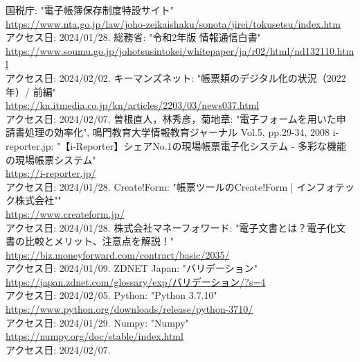 \documentclass[uplatex, report, a4j, 10pt]{jsbook}
\begin{document}
\begin{thebibliography}{0}
  国税庁: "電子帳簿保存制度特設サイト"\\\url{https://www.nta.go.jp/law/joho-zeikaishaku/sonota/jirei/tokusetsu/index.htm}\\アクセス日: 2024/01/28.
  総務省: "令和2年版 情報通信白書"\\\url{https://www.soumu.go.jp/johotsusintokei/whitepaper/ja/r02/html/nd132110.html}\\アクセス日: 2024/02/02.
  キーマンズネット: "帳票類のデジタル化の状況（2022年）/ 前編"\\\url{https://kn.itmedia.co.jp/kn/articles/2203/03/news037.html}\\アクセス日: 2024/02/07.
  曽根直人，林秀彦，菊地章: "電子フォームを用いた申請書処理の効率化", 鳴門教育大学情報教育ジャーナル Vol.5, pp.29-34, 2008
  i-reporter.jp: "【i-Reporter】シェアNo.1の現場帳票電子化システム - 多彩な機能の現場帳票システム"\\\url{https://i-reporter.jp/}\\アクセス日: 2024/01/28.
  Create!Form: "帳票ツールのCreate!Form | インフォテック株式会社""\\\url{https://www.createform.jp/}\\アクセス日: 2024/01/28.
  株式会社マネーフォワード: "電子文書とは？電子化文書の比較とメリット、注意点を解説！"\\\url{https://biz.moneyforward.com/contract/basic/2035/}\\アクセス日: 2024/01/09.
  ZDNET Japan: "バリデーション"\\\url{https://japan.zdnet.com/glossary/exp/バリデーション/?s=4}\\アクセス日: 2024/02/05.
  Python: "Python 3.7.10"\\\url{https://www.python.org/downloads/release/python-3710/}\\アクセス日: 2024/01/29.
  Numpy: "Numpy"\\\url{https://numpy.org/doc/stable/index.html}\\アクセス日: 2024/02/07.

\end{thebibliography}
\end{document}
